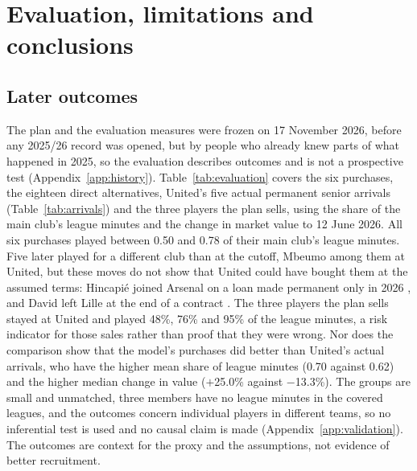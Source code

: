 \section{Evaluation, limitations and conclusions}\label{sec:evaluation}

\subsection{Later outcomes}

The plan and the evaluation measures were frozen on 17 November 2026, before any 2025/26 record was opened, but by people who already knew parts of what happened in 2025, so the evaluation describes outcomes and is not a prospective test (Appendix~\ref{app:history}). Table~\ref{tab:evaluation} covers the six purchases, the eighteen direct alternatives, United's five actual permanent senior arrivals (Table~\ref{tab:arrivals}) and the three players the plan sells, using the share of the main club's league minutes and the change in market value to 12 June 2026. All six purchases played between 0.50 and 0.78 of their main club's league minutes. Five later played for a different club than at the cutoff, Mbeumo among them at United, but these moves do not show that United could have bought them at the assumed terms: Hincapié joined Arsenal on a loan made permanent only in 2026 \citep{arsenal2026hincapie}, and David left Lille at the end of a contract \citep{bein2025david}. The three players the plan sells stayed at United and played 48\%, 76\% and 95\% of the league minutes, a risk indicator for those sales rather than proof that they were wrong. Nor does the comparison show that the model's purchases did better than United's actual arrivals, who have the higher mean share of league minutes (0.70 against 0.62) and the higher median change in value ($+$25.0\% against $-$13.3\%). The groups are small and unmatched, three members have no league minutes in the covered leagues, and the outcomes concern individual players in different teams, so no inferential test is used and no causal claim is made (Appendix~\ref{app:validation}). The outcomes are context for the proxy and the assumptions, not evidence of better recruitment.

\begin{table}[!htbp]
\centering
\caption{Outcomes in 2025/26 by group. ``Valid'' counts members with an observation: league minutes in the covered leagues, or a market value. $^{*}$Added after the evaluation as an extra description.}\label{tab:evaluation}
\end{table}

